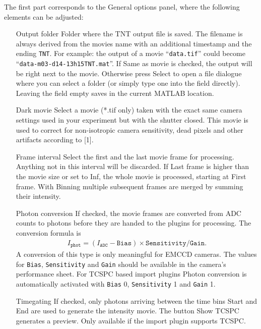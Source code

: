\documentclass[11pt,onside]{report}
\numberwithin{equation}{chapter}
\begin{document}
The first part corresponds to the \textsf{General options} panel, where the following elements can be adjusted:
\begin{itemize}[leftmargin=3.5cm]
\item[\textsf{Output folder}] Folder where the TNT output file is saved. The filename is always derived from the movies name with an additional timestamp and the ending \texttt{\textunderscore TNT}. For example: the output of a movie ``\texttt{data.tif}'' could become ``\texttt{data-m03-d14-13h15\textunderscore TNT.mat}''. If \textsf{Same as movie} is checked, the output will be right next to the movie. Otherwise press \textsf{Select} to open a file dialogue where you can select a folder (or simply type one into the field directly). Leaving the field empty saves in the current MATLAB location.
\item[\textsf{Dark movie}] Select a movie (*.tif only) taken with the exact same camera settings used in your experiment but with the shutter closed. This movie is used to correct for non-isotropic camera sensitivity, dead pixels and other artifacts according to [1].
\item[\textsf{Frame interval}] Select the first and the last movie frame for processing. Anything not in this interval will be discarded. If \textsf{Last frame} is higher than the movie size or set to \textsf{Inf}, the whole movie is processed, starting at \textsf{First frame}. With \textsf{Binning} multiple subsequent frames are merged by summing their intensity.
\item[\textsf{Photon conversion}] If checked, the movie frames are converted from ADC counts to photons before they are handed to the plugins for processing. The conversion formula is
\begin{align}
I_{\texttt{phot}} = (I_{\texttt{ADC}}-\texttt{Bias})\times\texttt{Sensitivity}/\texttt{Gain}.
\end{align}
A conversion of this type is only meaningful for EMCCD cameras. The values for \texttt{Bias}, \texttt{Sensitivity} and \texttt{Gain} should be available in the camera's performance sheet. For TCSPC based import plugins \textsf{Photon conversion} is automatically activated with \texttt{Bias} 0, \texttt{Sensitivity} 1 and \texttt{Gain} 1.
\item[\textsf{Timegating}] If checked, only photons arriving between the time bins \textsf{Start} and \textsf{End} are used to generate the intensity movie. The button \textsf{Show TCSPC} generates a preview. Only available if the import plugin supports TCSPC.
\end{itemize}
\end{document}
